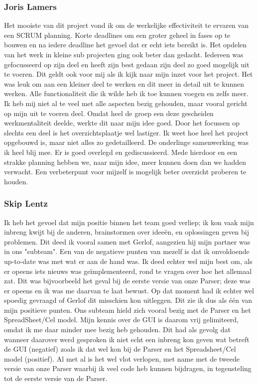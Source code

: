 \documentclass[a4paper,11pt]{article}
\begin{document}
\subsubsection{Joris Lamers}
Het mooiste van dit project vond ik om de werkelijke effectiviteit te ervaren van een SCRUM planning. Korte deadlines om een groter geheel in fases op te bouwen en na iedere deadline het gevoel dat er echt iets bereikt is. Het opdelen van het werk in kleine sub projecten ging ook beter dan gedacht. Iedereen was gefocusseerd op zijn deel en heeft zijn best gedaan zijn deel zo goed mogelijk uit te voeren. Dit geldt ook voor mij als ik kijk naar mijn inzet voor het project. Het was leuk om aan een kleiner deel te werken en dit meer in detail uit te kunnen werken. Alle functionaliteit die ik wilde heb ik toe kunnen voegen en zelfs meer. Ik heb mij niet al te veel met alle aspecten bezig gehouden, maar vooral gericht op mijn uit te voeren deel. Omdat heel de groep een deze gescheiden werkmentaliteit deelde, werkte dit naar mijn idee goed. Door het focussen op slechts een deel is het overzichtsplaatje wel lastiger. Ik weet hoe heel het project opgebouwd is, maar niet alles zo gedetailleerd. De onderlinge samenwerking was ik heel blij mee. Er is goed overlegd en gediscussieerd. Mede hierdoor en een strakke planning hebben we, naar mijn idee, meer kunnen doen dan we hadden verwacht. Een verbeterpunt voor mijzelf is mogelijk beter overzicht proberen te houden.
\subsubsection{Skip Lentz}
Ik heb het gevoel dat mijn positie binnen het team goed verliep; ik kon vaak mijn inbreng kwijt bij de anderen, brainstormen over idee\"{e}n, en oplossingen geven bij problemen. Dit deed ik vooral samen met Gerlof, aangezien hij mijn partner was in ons "subteam".
Een van de negatieve punten van mezelf is dat ik onvoldoende up-to-date was met wat er aan de hand was. Ik deed echter wel mijn best om, als er opeens iets nieuws was ge\"{i}mplementeerd, rond te vragen over hoe het allemaal zat. Dit was bijvoorbeeld het geval bij de eerste versie van onze Parser; deze was er opeens en ik was me daarvan te laat bewust. Op dat moment had ik echter wel spoedig gevraagd of Gerlof dit misschien kon uitleggen. Dit zie ik dus als \'{e}\'{e}n van mijn positieve punten.
Ons subteam hield zich vooral bezig met de Parser en het SpreadSheet/Cel model. Mijn kennis over de GUI is daarom vrij gelimiteerd, omdat ik me daar minder mee bezig heb gehouden. Dit had als gevolg dat wanneer daarover werd gesproken ik niet echt een inbreng kon geven wat betreft de GUI (negatief) zoals ik dat wel kon bij de Parser en het Spreadsheet/Cel model (positief).
Al met al is het wel vlot verlopen, met name met de tweede versie van onze Parser waarbij ik veel code heb kunnen bijdragen, in tegensteling tot de eerste versie van de Parser.
\end{document}
